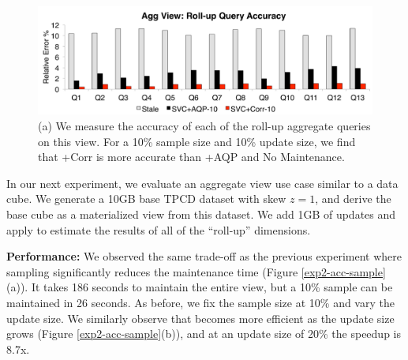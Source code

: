 \begin{figure}[t]
\centering
 \includegraphics[scale=0.13]{exp/msdc_3.pdf}\vspace{-.5em}
   \caption{(a) We measure the accuracy of each of the roll-up aggregate queries on this view. For a 10\% sample size and 10\% update size, we find that \svcnospace+Corr is more accurate than \svcnospace+AQP and No Maintenance.\vspace{-.5em}\label{exp2-acc-sample2}}
\end{figure}





In our next experiment, we evaluate an aggregate view use case similar to a data cube.
We generate a 10GB base TPCD dataset with skew $z=1$, and derive the base cube as a materialized view from this dataset.
We add 1GB of updates and apply \svc to estimate the results of all of the ``roll-up'' dimensions.

\textbf{Performance: }
We observed the same trade-off as the previous experiment where sampling significantly reduces the maintenance time (Figure \ref{exp2-acc-sample}(a)).
It takes 186 seconds to maintain the entire view, but a 10\% sample can be maintained in 26 seconds.
As before, we fix the sample size at 10\% and vary the update size.
We similarly observe that \svc becomes more efficient as the update size grows (Figure \ref{exp2-acc-sample}(b)), and at an update size of 20\%  the speedup is 8.7x.

